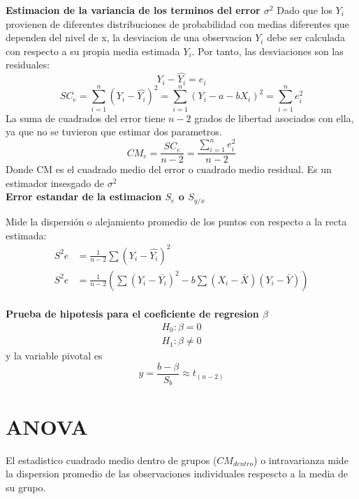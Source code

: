 \documentclass[10pt,a4paper]{article}
\begin{document}
\textbf{Estimacion de la variancia de los terminos del error $\sigma^2$}
Dado que los $Y_i$ provienen de diferentes distribuciones de probabilidad con medias diferentes que dependen del nivel de x, la desviacion de una observacion $Y_i$ debe ser calculada con respecto a su propia media estimada $Y_i$. Por tanto, las desviaciones son las residuales:
\begin{equation}
	Y_i-\hat{Y_i}=e_i
\end{equation}
\begin{equation}
	SC_e=\sum_{i=1}^n\left(Y_i-\hat{Y_i}\right)^2=\sum_{i=1}^n \left(Y_i-a-bX_i\right)^2=\sum_{i=1}^n e_i^2
\end{equation}
La suma de cuadrados del error tiene $n-2$ grados de libertad asociados con ella, ya que no se tuvieron que estimar dos parametros.
\begin{equation}
	CM_e=\frac{SC_e}{n-2}=\dfrac{\sum_{i=1}^n e_i^2}{n-2}
\end{equation}
Donde CM es el cuadrado medio del error o cuadrado medio residual. Es un estimador insesgado de $\sigma^2$\\

\textbf{Error estandar de la estimacion $S_e$ o $S_{y/x}$}

Mide la dispersión o alejamiento promedio de los puntos con respecto a la recta estimada:
\begin{align}
	S^2e&=\frac{1}{n-2}\sum\left(Y_i-\hat{Y_i}\right)^2\\
	S^2e&=\frac{1}{n-2}\left(\sum\left(Y_i-\bar{Y_i}\right)^2-b\sum\left(X_i-\bar{X}\right)\left(Y_i-\bar{Y}\right)\right)
\end{align}
\\\textbf{Prueba de hipotesis para el coeficiente de regresion $\beta$}
\begin{align}
	H_0:\beta=0\\
	H_1:\beta\neq 0
\end{align}
y la variable pivotal es
\begin{equation}
	y=\frac{b-\beta}{S_b}\approx t_{(n-2)}
\end{equation}

\section{ANOVA}

El estadistico cuadrado medio dentro de grupos ($CM_{dentro}$) o intravarianza mide la dispersion promedio de las observaciones individuales respescto a la media de su grupo.
\end{document}
